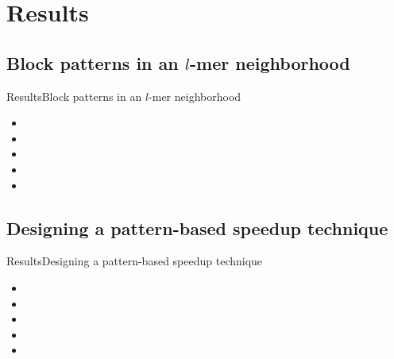\documentclass[pdf,xcolor={dvipsnames}]{beamer}
\begin{document}
\section{Results}
	
	\subsection{Block patterns in an $l$-mer neighborhood}
	\begin{frame}{Results}{Block patterns in an $l$-mer neighborhood}
		\begin{itemize}
		\item 
		\item
		\item
		\item
		\item 
		\end{itemize}

		\end{frame}

	\subsection{Designing a pattern-based speedup technique}
	\begin{frame}{Results}{Designing a pattern-based speedup technique}
		\begin{itemize}
		\item 
		\item
		\item
		\item
		\item 
		\end{itemize}
		\end{frame}
\end{document}
